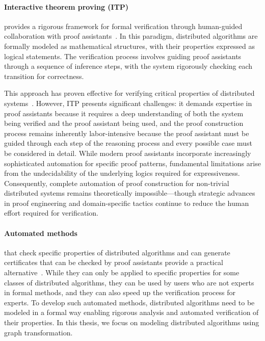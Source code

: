\paragraph{Interactive theorem proving (ITP)}
provides a rigorous framework for formal verification through human-guided collaboration with proof assistants~\cite{nipkow2002isabelle,bertot2004coq,moura2021lean4}. In this paradigm, distributed algorithms are formally modeled as mathematical structures, with their properties expressed as logical statements. The verification process involves guiding proof assistants through a sequence of inference steps, with the system rigorously checking each transition for correctness.

This approach has proven effective for verifying critical properties of distributed systems~\cite{plump2024formalisingDPO,potop2019formal,courtieu2016certified}.
However, ITP presents significant challenges: it demands expertise in proof assistants because it requires a deep understanding of both the system being verified and the proof assistant being used, and the proof construction process remains inherently labor-intensive because the proof assistant must be guided through each step of the reasoning process and every possible case must be considered in detail.
 While modern proof assistants incorporate increasingly sophisticated automation for specific proof patterns, fundamental limitations arise from the undecidability of the underlying logics required for expressiveness.
 Consequently, complete automation of proof construction for non-trivial distributed systems remains theoretically impossible—though strategic advances in proof engineering and domain-specific tactics continue to reduce the human effort required for verification.

\paragraph{Automated methods} that check specific properties of distributed algorithms and can generate certificates that can be checked by proof assistants provide a practical alternative~\cite{contejean2011automated,giesl2014proving}. While they can only be applied to specific properties for some classes of distributed algorithms, they can be used by users who are not experts in formal methods, and they can also speed up the verification process for experts. To develop such automated methods, distributed algorithms need to be modeled in a formal way enabling rigorous analysis and automated verification of their properties. In this thesis, we focus on modeling distributed algorithms using graph transformation.

